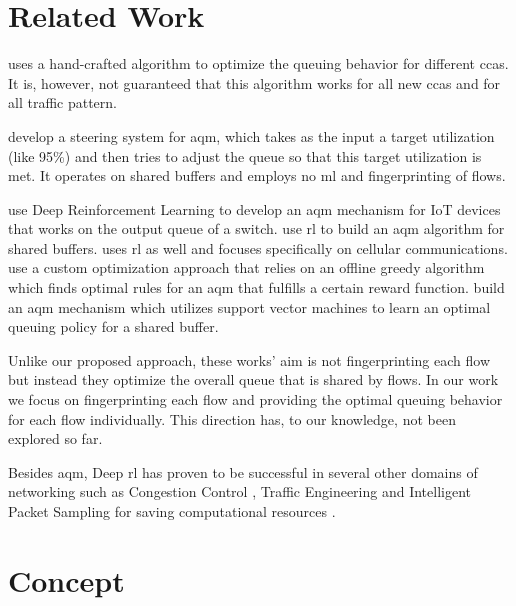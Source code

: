 \documentclass[conference]{IEEEtran}
\begin{document}
\section{Related Work}

\cite{bachl_cocoa_2019} uses a hand-crafted algorithm to optimize the queuing behavior for different \glspl{cca}. It is, however, not guaranteed that this algorithm works for all new \glspl{cca} and for all traffic pattern. 

\cite{bless_policy-oriented_2018} develop a steering system for \gls{aqm}, which takes as the input a target utilization (like 95\%) and then tries to adjust the queue so that this target utilization is met. It operates on shared buffers and employs no \gls{ml} and fingerprinting of flows. 

\cite{kim_deep_2019} use Deep Reinforcement Learning to develop an \gls{aqm} mechanism for IoT devices that works on the output queue of a switch.  \cite{bouacida_practical_2019,bisoy_design_2017} use \gls{rl} to build an \gls{aqm} algorithm for shared buffers. \cite{vucevic_reinforcement_2007} uses \gls{rl} as well and focuses specifically on cellular communications. \cite{lin_kemy_2015} use a custom optimization approach that relies on an offline greedy algorithm which finds optimal rules for an \gls{aqm} that fulfills a certain reward function. \cite{shah_sam_2016} build an \gls{aqm} mechanism which utilizes support vector machines to learn an optimal queuing policy for a shared buffer. 

Unlike our proposed approach, these works' aim is not fingerprinting each flow but instead they optimize the overall queue that is shared by flows. In our work we focus on fingerprinting each flow and providing the optimal queuing behavior for each flow individually. This direction has, to our knowledge, not been explored so far. 

Besides \gls{aqm}, Deep \gls{rl} has proven to be successful in several other domains of networking such as Congestion Control \cite{jay_deep_2019,bachl_rax_2019}, Traffic Engineering \cite{xu_experience-driven_2018} and Intelligent Packet Sampling for saving computational resources \cite{bachl_sparseids_2020}. 

\section{Concept}
\label{sec:concept}
\end{document}

